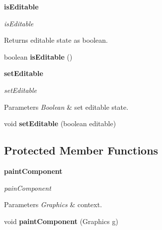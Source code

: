 \begin{Indent}{\bf is\+Editable}\par
{\em is\+Editable

\begin{DoxyReturn}{Returns}
editable state as boolean. 
\end{DoxyReturn}
}\begin{DoxyCompactItemize}
\item 
\hypertarget{classbattleship_1_1screen_1_1InputPanel_a06cc1a997693cd32c05d4fd09ce70e76}{}boolean {\bfseries is\+Editable} ()\label{classbattleship_1_1screen_1_1InputPanel_a06cc1a997693cd32c05d4fd09ce70e76}

\end{DoxyCompactItemize}
\end{Indent}
\begin{Indent}{\bf set\+Editable}\par
{\em set\+Editable


\begin{DoxyParams}{Parameters}
{\em Boolean} & set editable state. \\
\hline
\end{DoxyParams}
}\begin{DoxyCompactItemize}
\item 
\hypertarget{classbattleship_1_1screen_1_1InputPanel_afa2e559f484dc1082a06e731836d9165}{}void {\bfseries set\+Editable} (boolean editable)\label{classbattleship_1_1screen_1_1InputPanel_afa2e559f484dc1082a06e731836d9165}

\end{DoxyCompactItemize}
\end{Indent}
\subsection*{Protected Member Functions}
\begin{Indent}{\bf paint\+Component}\par
{\em pain\+Component


\begin{DoxyParams}{Parameters}
{\em Graphics} & context. \\
\hline
\end{DoxyParams}
}\begin{DoxyCompactItemize}
\item 
\hypertarget{classbattleship_1_1screen_1_1InputPanel_ae7eb4c19a4f7146b8a4c6e40d2eede23}{}void {\bfseries paint\+Component} (Graphics g)\label{classbattleship_1_1screen_1_1InputPanel_ae7eb4c19a4f7146b8a4c6e40d2eede23}

\end{DoxyCompactItemize}
\end{Indent}



